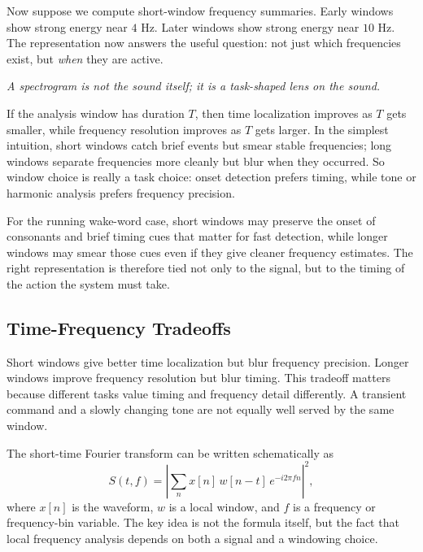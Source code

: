 Now suppose we compute short-window frequency summaries. Early windows show strong energy near $4$ Hz. Later windows show strong energy near $10$ Hz. The representation now answers the useful question: not just which frequencies exist, but \emph{when} they are active.

\begin{center}
\emph{A spectrogram is not the sound itself; it is a task-shaped lens on the sound.}
\end{center}

\begin{mathlens}
If the analysis window has duration $T$, then time localization improves as $T$ gets smaller, while frequency resolution improves as $T$ gets larger. In the simplest intuition, short windows catch brief events but smear stable frequencies; long windows separate frequencies more cleanly but blur when they occurred. So window choice is really a task choice: onset detection prefers timing, while tone or harmonic analysis prefers frequency precision.
\end{mathlens}

\begin{example}
For the running wake-word case, short windows may preserve the onset of consonants and brief timing cues that matter for fast detection, while longer windows may smear those cues even if they give cleaner frequency estimates. The right representation is therefore tied not only to the signal, but to the timing of the action the system must take.
\end{example}

\subsection{Time-Frequency Tradeoffs}

Short windows give better time localization but blur frequency precision. Longer windows improve frequency resolution but blur timing. This tradeoff matters because different tasks value timing and frequency detail differently. A transient command and a slowly changing tone are not equally well served by the same window.

\begin{advancednote}
The short-time Fourier transform can be written schematically as
\[
S(t,f) = \left| \sum_n x[n]\,w[n-t]\,e^{-i2\pi fn} \right|^2,
\]
where $x[n]$ is the waveform, $w$ is a local window, and $f$ is a frequency or frequency-bin variable. The key idea is not the formula itself, but the fact that local frequency analysis depends on both a signal and a windowing choice.
\end{advancednote}

